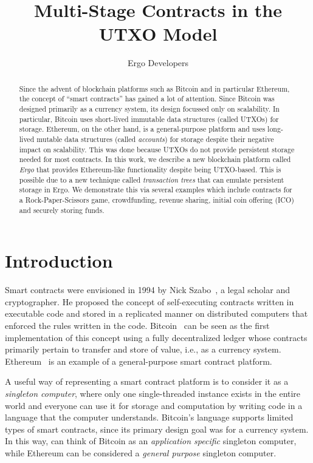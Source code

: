 \documentclass[runningheads]{llncs}
\begin{document}
\title{Multi-Stage Contracts in the UTXO Model}

\author{Ergo Developers}

\maketitle


\begin{abstract}
	
Since the advent of blockchain platforms such as Bitcoin and in particular Ethereum, the concept of ``smart contracts'' has gained a lot of attention. Since Bitcoin was designed primarily as a currency system, its design focussed only on scalability. In particular, Bitcoin uses short-lived immutable data structures (called UTXOs) for storage. Ethereum, on the other hand, is a general-purpose platform and uses long-lived mutable data structures (called {\em accounts}) for storage despite their negative impact on scalability. This was done because UTXOs do not provide persistent storage needed for most contracts.
In this work, we describe a new blockchain platform called {\em Ergo} that provides Ethereum-like functionality despite being UTXO-based. 
This is possible due to a new technique called {\em transaction trees} that can emulate persistent storage in Ergo. We demonstrate this via several examples which include contracts for a Rock-Paper-Scissors game, crowdfunding, revenue sharing, initial coin offering (ICO) and securely storing funds.

\end{abstract}


\section{Introduction}

Smart contracts were envisioned in 1994 by Nick Szabo~\cite{szabo1997idea}, a legal scholar and cryptographer. He proposed the concept of self-executing contracts written in executable code and stored in a replicated manner on distributed computers that enforced the rules written in the code. 
Bitcoin~\cite{Nak08} can be seen as the first implementation of this concept using a fully decentralized ledger whose contracts primarily pertain to transfer and store of value, i.e., as a currency system. 
Ethereum~\cite{wood2014ethereum} is an example of a general-purpose smart contract platform. 

A useful way of representing a smart contract platform is to consider it as a {\em singleton computer}, where only one single-threaded instance exists in the entire world and everyone can use it for storage and computation by writing code in a language that the computer understands.
Bitcoin's language supports limited types of smart contracts, since its primary design goal was for a currency system. In this way, can think of Bitcoin as an {\em application specific} singleton computer, while Ethereum can be considered a {\em general purpose} singleton computer.
\end{document}
